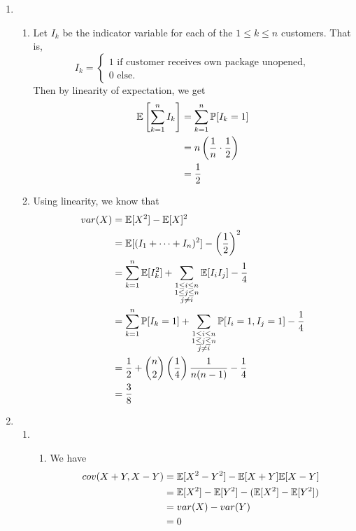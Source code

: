 \begin{enumerate}
    \item \begin{enumerate} 
        \item Let $I_k$ be the indicator variable for each of the $1 \leq k \leq n$ customers. That is,
    \[ I_k =
    \begin{cases}
        1 \text{ if customer receives own package unopened}, \\
        0 \text{ else}.
    \end{cases}
    \]
    Then by linearity of expectation, we get
    \begin{align*}
    \mathbb{E}\left[\sum\limits_{k = 1}^n I_k\right] &= \sum\limits_{k = 1}^n \mathbb{P}[I_k = 1] \\
        &= n \left( \frac{1}{n} \cdot \frac{1}{2} \right) \\
        &= \frac{1}{2}
    \end{align*}
    
    \item Using linearity, we know that
    \begin{align*}
        var(X) &= \mathbb{E}[X^2] - \mathbb{E}[X]^2 \\
            &= \mathbb{E}[(I_1 + \dots + I_n)^2] - \left(\frac{1}{2}\right)^2 \\
            &= \sum\limits_{k = 1}^n\mathbb{E}[I_k^2] + \sum_{\substack{1 \leq i \leq n \\ 1 \leq j \leq n \\ j \neq i}}\mathbb{E}[I_iI_j] - \frac{1}{4} \\
            &= \sum\limits_{k = 1}^n\mathbb{P}[I_k = 1] + \sum_{\substack{1 \leq i \leq n \\ 1 \leq j \leq n \\ j \neq i}}\mathbb{P}[I_i = 1, I_j = 1] - \frac{1}{4} \\
            &= \frac{1}{2} + \binom{n}{2}\left(\frac{1}{4}\right)\frac{1}{n(n-1)} - \frac{1}{4} \\
            &= \frac{3}{8}
    \end{align*}
    \end{enumerate}
    
    \item \begin{enumerate}
        \item \begin{enumerate} \item We have 
            \begin{align*}
                cov(X + Y, X - Y) &= \mathbb{E}[X^2 - Y^2] - \mathbb{E}[X + Y]\mathbb{E}[X - Y] \\
                    &= \mathbb{E}[X^2] - \mathbb{E}[Y^2] - (\mathbb{E}[X^2] - \mathbb{E}[Y^2]) \\
                    &= var(X) - var(Y) \\
                    &= 0
            \end{align*}
            

\end{enumerate}
\end{enumerate}
\end{enumerate}
